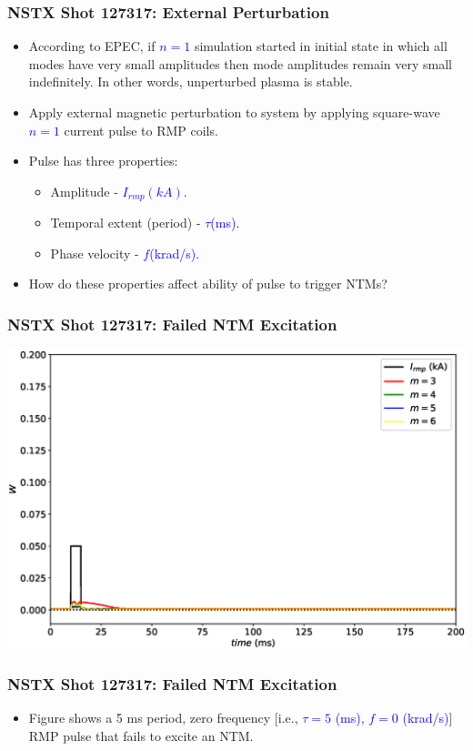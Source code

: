 \documentclass{beamer}
\newcommand{\blue}[1]{\textcolor{blue}{#1}}
\begin{document}
\begin{frame}
\frametitle{NSTX Shot 127317: External Perturbation}
\begin{itemize}
\item According to EPEC, if \blue{$n=1$} simulation started in initial state in which all modes have very small
amplitudes then mode amplitudes remain very small indefinitely. In other words, unperturbed plasma is
stable.
\item Apply external magnetic perturbation to system by applying square-wave \blue{$n=1$} current pulse to RMP coils. 
\item Pulse has three properties:
\begin{itemize}
\item Amplitude - \blue{$I_{rmp}(kA)$}.
\item Temporal extent (period)  - \blue{$\tau$(ms)}.
\item Phase velocity - \blue{$f$(krad/s)}.
\end{itemize}
\item How do these properties affect ability of pulse to trigger NTMs?
\end{itemize}

\end{frame}

\begin{frame}
\frametitle{NSTX Shot 127317: Failed NTM Excitation}
\begin{center}
\includegraphics[width=\textwidth]{Waveform0.eps}
\end{center}

\end{frame}

\begin{frame}
\frametitle{NSTX Shot 127317: Failed NTM Excitation}
\begin{itemize}
\item Figure shows a 5 ms period, zero frequency [i.e., \blue{$\tau=5$ (ms)}, \blue{$f= 0$ (krad/s)}] RMP
pulse that  fails to excite an NTM. 
\end{itemize}
\end{frame}
\end{document}
